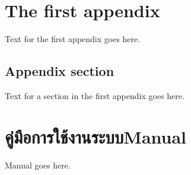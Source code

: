 \chapter{The first appendix}

Text for the first appendix goes here.

\section{Appendix section}

Text for a section in the first appendix goes here.

\chapter{\ifcpe คู่มือการใช้งานระบบ\else Manual\fi}

Manual goes here.
